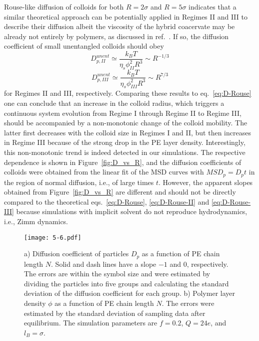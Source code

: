 \documentclass[journal=mamobx, manuscript=article]{achemso}
\begin{document}
Rouse-like diffusion of colloids for both $R = 2 \sigma$ and $R = 5 \sigma$ indicates that a similar theoretical approach can be potentially applied in Regimes II and III to describe their diffusion albeit the viscosity of the hybrid coacervate may be already not entirely by polymers, as discussed in ref.~. If so, the diffusion coefficient of small unentangled colloids should obey
\begin{equation}
D_{p, II}^{unent} \simeq \frac{k_{B}T}{\eta_{s}\phi_{II}^{2}R^{3}} \sim R^{-1/3}
\label{eq:D-Rouse-II}
\end{equation}
\begin{equation}
D_{p, III}^{unent} \simeq \frac{k_{B}T}{\eta_{s}\phi_{III}^{2}R^{3}} \sim R^{7/3}
\label{eq:D-Rouse-III}
\end{equation}
for Regimes II and III, respectively. Comparing these results to eq.~\ref{eq:D-Rouse} one can conclude that an increase in the colloid radius, which triggers a continuous system evolution from Regime I through Regime II to Regime III, should be accompanied by a non-monotonic change of the colloid mobility. The latter first decreases with the colloid size in Regimes I and II, but then increases in Regime III because of the strong drop in the PE layer density. Interestingly, this non-monotonic trend is indeed detected in our simulations. The respective dependence is shown in Figure~\ref{fig:D_vs_R}, and the diffusion coefficients of colloids were obtained from the linear fit of the MSD curves with $MSD_{p} = D_{p} t$ in the region of normal diffusion, i.e., of large times $t$. However, the apparent slopes obtained from Figure~\ref{fig:D_vs_R} are different and should not be directly compared to the theoretical eqs.~\ref{eq:D-Rouse}, \ref{eq:D-Rouse-II} and \ref{eq:D-Rouse-III} because simulations with implicit solvent do not reproduce hydrodynamics, i.e., Zimm dynamics.  


\begin{figure}[ht]
\centering
\texttt{[image: 5-6.pdf]}
\caption{ a) Diffusion coefficient of particles $D_{p}$ as a function of PE chain length $N$. Solid and dash lines have a slope $-1$ and $0$, respectively. The errors are within the symbol size and were estimated by dividing the particles into five groups and calculating the standard deviation of the diffusion coefficient for each group. 
b) Polymer layer density $\phi$ as a function of PE chain length $N$. The errors were estimated by the standard deviation of sampling data after equilibrium. The simulation parameters are $f = 0.2$, $Q = 24e$, and $l_{B} = \sigma$.}
\label{fig:D_vs_N}
\end{figure}
\end{document}

